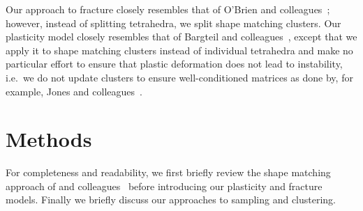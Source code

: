 \documentclass[review]{acmsiggraph}
\begin{document}
Our approach 
to fracture closely resembles that of O'Brien and colleagues~; however, instead of splitting tetrahedra,
we split shape matching clusters.  Our plasticity model closely resembles that of Bargteil and colleagues~, except that
we apply it to shape matching clusters instead of individual tetrahedra and make no particular effort to ensure that plastic deformation does not
lead to instability, i.e.~we do not update clusters to ensure well-conditioned matrices as done by, for example, Jones and colleagues~.

\section{Methods}
For completeness and readability, we first briefly review the shape matching approach of \Mueller and colleagues~ before
introducing our plasticity and fracture models.  Finally we briefly discuss our approaches to sampling and clustering.
\end{document}
